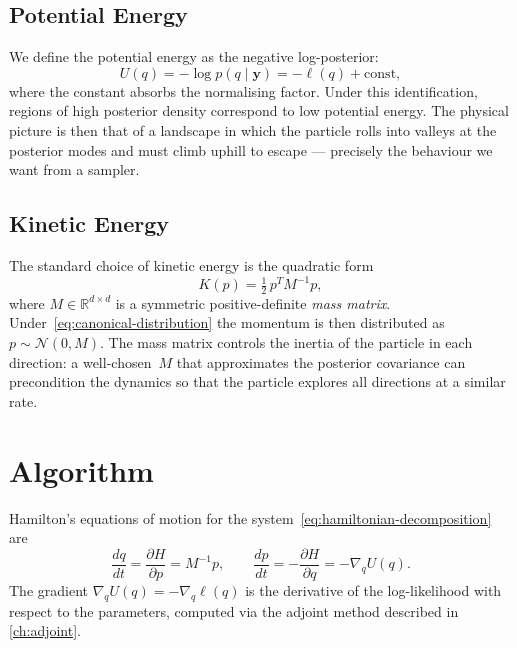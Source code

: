 \subsection{Potential Energy}

We define the potential energy as the negative log-posterior:
\begin{equation}
  U(q) = -\log p(q \mid \mathbf{y}) = -\ell(q) + \text{const},
  \label{eq:potential-energy}
\end{equation}
where the constant absorbs the normalising factor. Under this
identification, regions of high posterior density correspond to low
potential energy. The physical picture is then that of a landscape in
which the particle rolls into valleys at the posterior modes and must
climb uphill to escape --- precisely the behaviour we want from a
sampler.

\subsection{Kinetic Energy}

The standard choice of kinetic energy is the quadratic form
\begin{equation}
  K(p) = \tfrac{1}{2}\, p^T M^{-1} p,
  \label{eq:kinetic-energy}
\end{equation}
where $M \in \mathbb{R}^{d \times d}$ is a symmetric positive-definite
\emph{mass matrix}. Under~\cref{eq:canonical-distribution} the momentum
is then distributed as $p \sim \mathcal{N}(0, M)$. The mass matrix
controls the inertia of the particle in each direction: a well-chosen~$M$
that approximates the posterior covariance can precondition the dynamics
so that the particle explores all directions at a similar rate.

\section{Algorithm}\label{sec:hmc-algorithm}

Hamilton's equations of motion for the
system~\cref{eq:hamiltonian-decomposition}
are
\begin{equation}
  \frac{dq}{dt} = \frac{\partial H}{\partial p} = M^{-1}p,
  \qquad
  \frac{dp}{dt} = -\frac{\partial H}{\partial q} = -\nabla_q U(q).
  \label{eq:hamiltons-equations}
\end{equation}
The gradient $\nabla_q U(q) = -\nabla_q \ell(q)$ is the
derivative of the log-likelihood with respect to the parameters, computed
via the adjoint method described in \cref{ch:adjoint}.


